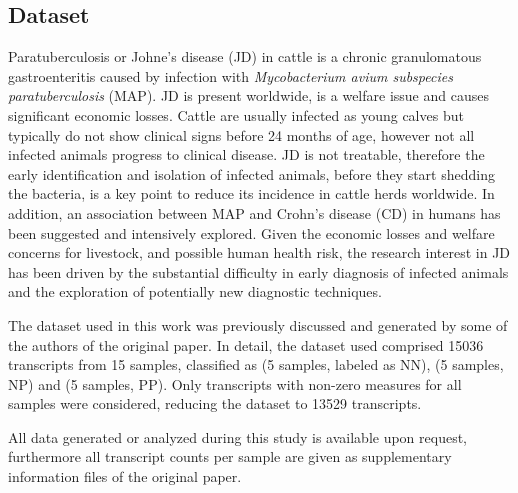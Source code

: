 \documentclass{standalone}
\begin{document}
\subsection[Dataset]{Dataset}\label{bovine_data}

Paratuberculosis or Johne's disease (JD) in cattle is a chronic granulomatous gastroenteritis caused by infection with \emph{Mycobacterium avium subspecies paratuberculosis} (MAP).
JD is present worldwide, is a welfare issue and causes significant economic losses.
Cattle are usually infected as young calves but typically do not show clinical signs before 24 months of age, however not all infected animals progress to clinical disease.
JD is not treatable, therefore the early identification and isolation of infected animals, before they start shedding the bacteria, is a key point to reduce its incidence in cattle herds worldwide.
In addition, an association between MAP and Crohn's disease (CD) in humans has been suggested and intensively explored.
Given the economic losses and welfare concerns for livestock, and possible human health risk, the research interest in JD has been driven by the substantial difficulty in early diagnosis of infected animals and the exploration of potentially new diagnostic techniques.

The dataset used in this work was previously discussed and generated by some of the authors of the original paper.
In detail, the dataset used comprised 15036 transcripts from 15 samples, classified as  (5 samples, labeled as NN),  (5 samples, NP) and  (5 samples, PP).
Only transcripts with non-zero measures for all samples were considered, reducing the dataset to 13529 transcripts.

All data generated or analyzed during this study is available upon request, furthermore all transcript counts per sample are given as supplementary information files of the original paper.
\end{document}
